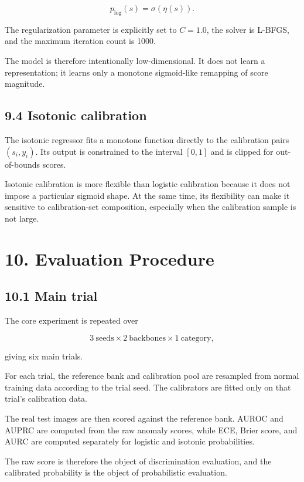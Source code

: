 \documentclass[
  11pt,
]{article}
\begin{document}
\[
p_{\mathrm{log}}(s)=\sigma(\eta(s)).
\]

The regularization parameter is explicitly set to \(C=1.0\), the solver
is L-BFGS, and the maximum iteration count is 1000.

The model is therefore intentionally low-dimensional. It does not learn
a representation; it learns only a monotone sigmoid-like remapping of
score magnitude.

\subsection{9.4 Isotonic calibration}\label{isotonic-calibration}

The isotonic regressor fits a monotone function directly to the
calibration pairs \((s_i,y_i)\). Its output is constrained to the
interval \([0,1]\) and is clipped for out-of-bounds scores.

Isotonic calibration is more flexible than logistic calibration because
it does not impose a particular sigmoid shape. At the same time, its
flexibility can make it sensitive to calibration-set composition,
especially when the calibration sample is not large.

\section{10. Evaluation Procedure}\label{evaluation-procedure}

\subsection{10.1 Main trial}\label{main-trial}

The core experiment is repeated over

\[
3\ \text{seeds}\times 2\ \text{backbones}\times 1\ \text{category},
\]

giving six main trials.

For each trial, the reference bank and calibration pool are resampled
from normal training data according to the trial seed. The calibrators
are fitted only on that trial's calibration data.

The real test images are then scored against the reference bank. AUROC
and AUPRC are computed from the raw anomaly scores, while ECE, Brier
score, and AURC are computed separately for logistic and isotonic
probabilities.

The raw score is therefore the object of discrimination evaluation, and
the calibrated probability is the object of probabilistic evaluation.
\end{document}
